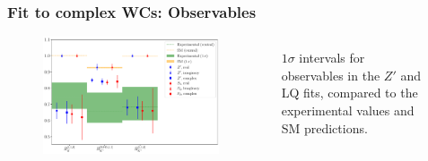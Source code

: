 \documentclass[mathserif, 10pt]{beamer}
\begin{document}
\begin{frame}\frametitle{Fit to complex WCs: Observables}

    \begin{figure}
        \begin{columns}
            \begin{column}{0.48\textwidth}
                \centering
                \includegraphics[width = 0.8\textwidth]{figures/errorplot_RKmodels.pdf}
            \end{column}
            \begin{column}{0.48\textwidth}
                $1\sigma$ intervals for observables in the {\color{blue}$Z'$} and {\color{red} LQ} fits, compared to the {\color{green} experimental values} and {\color{orange} SM predictions}.



\end{column}
\end{columns}
\end{figure}
\end{frame}
\end{document}
